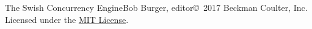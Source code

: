 \documentclass[letterpaper,11pt,twoside,final]{report}
\begin{document}
\begin{sagianbook}{The Swish Concurrency Engine}{Bob Burger,
    editor}{\copyright\ 2017 Beckman Coulter, Inc.
    Licensed under the \href{https://opensource.org/licenses/MIT}{MIT License}.}



\end{sagianbook}
\end{document}
